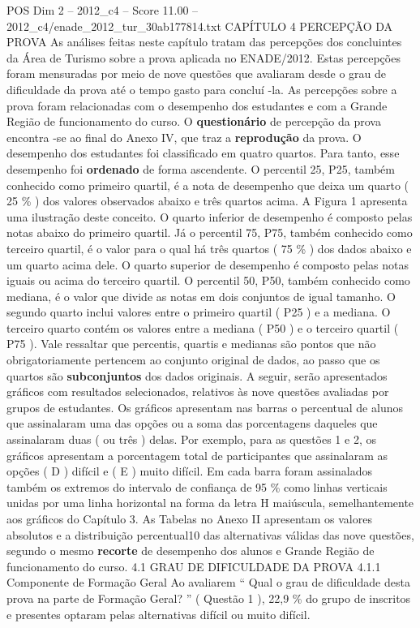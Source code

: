 \begin{textsample}{POS Dim 2 – 2012\_c4 – Score 11.00 – 2012\_c4/enade\_2012\_tur\_30ab177814.txt}  \label{ex:f2_pos_110}
CAPÍTULO 4 PERCEPÇÃO DA PROVA As análises feitas neste capítulo tratam das percepções dos concluintes da Área de Turismo sobre a prova aplicada no ENADE/2012.
Estas percepções foram mensuradas por meio de nove questões que avaliaram desde o grau de dificuldade da prova até o tempo gasto para concluí -la.
As percepções sobre a prova foram relacionadas com o desempenho dos estudantes e com a Grande Região de funcionamento do curso.
O \textbf{questionário} de percepção da prova encontra -se ao final do Anexo IV, que traz a \textbf{reprodução} da prova.
O desempenho dos estudantes foi classificado em quatro quartos.
Para tanto, esse desempenho foi \textbf{ordenado} de forma ascendente.
O percentil 25, P25, também conhecido como primeiro quartil, é a nota de desempenho que deixa um quarto ( 25 \% ) dos valores observados abaixo e três quartos acima.
A Figura 1 apresenta uma ilustração deste conceito.
O quarto inferior de desempenho é composto pelas notas abaixo do primeiro quartil.
Já o percentil 75, P75, também conhecido como terceiro quartil, é o valor para o qual há três quartos ( 75 \% ) dos dados abaixo e um quarto acima dele.
O quarto superior de desempenho é composto pelas notas iguais ou acima do terceiro quartil.
O percentil 50, P50, também conhecido como mediana, é o valor que divide as notas em dois conjuntos de igual tamanho.
O segundo quarto inclui valores entre o primeiro quartil ( P25 ) e a mediana.
O terceiro quarto contém os valores entre a mediana ( P50 ) e o terceiro quartil ( P75 ).
Vale ressaltar que percentis, quartis e medianas são pontos que não obrigatoriamente pertencem ao conjunto original de dados, ao passo que os quartos são \textbf{subconjuntos} dos dados originais.
A seguir, serão apresentados gráficos com resultados selecionados, relativos às nove questões avaliadas por grupos de estudantes.
Os gráficos apresentam nas barras o percentual de alunos que assinalaram uma das opções ou a soma das porcentagens daqueles que assinalaram duas ( ou três ) delas.
Por exemplo, para as questões 1 e 2, os gráficos apresentam a porcentagem total de participantes que assinalaram as opções ( D ) difícil e ( E ) muito difícil.
Em cada barra foram assinalados também os extremos do intervalo de confiança de 95 \% como linhas verticais unidas por uma linha horizontal na forma da letra H maiúscula, semelhantemente aos gráficos do Capítulo 3.
As Tabelas no Anexo II apresentam os valores absolutos e a distribuição percentual10 das alternativas válidas das nove questões, segundo o mesmo \textbf{recorte} de desempenho dos alunos e Grande Região de funcionamento do curso. 4.1 GRAU DE DIFICULDADE DA PROVA 4.1.1 Componente de Formação Geral Ao avaliarem “ Qual o grau de dificuldade desta prova na parte de Formação Geral? ” ( Questão 1 ), 22,9 \% do grupo de inscritos e presentes optaram pelas alternativas difícil ou muito difícil.

\end{textsample}
